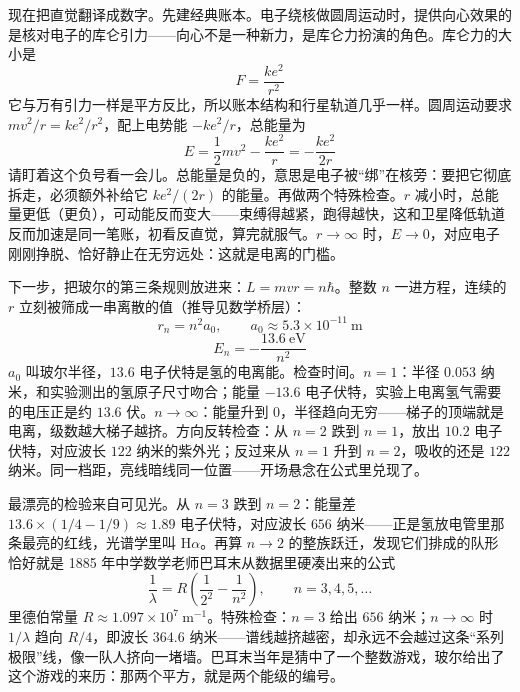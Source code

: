 
\begin{mainline}
现在把直觉翻译成数字。先建经典账本。电子绕核做圆周运动时，提供向心效果的是核对电子的库仑引力——向心不是一种新力，是库仑力扮演的角色。库仑力的大小是
\[
F=\frac{ke^{2}}{r^{2}}
\]
它与万有引力一样是平方反比，所以账本结构和行星轨道几乎一样。圆周运动要求 \(mv^{2}/r=ke^{2}/r^{2}\)，配上电势能 \(-ke^{2}/r\)，总能量为
\[
E=\frac{1}{2}mv^{2}-\frac{ke^{2}}{r}=-\frac{ke^{2}}{2r}
\]
请盯着这个负号看一会儿。总能量是负的，意思是电子被“绑”在核旁：要把它彻底拆走，必须额外补给它 \(ke^{2}/(2r)\) 的能量。再做两个特殊检查。\(r\) 减小时，总能量更低（更负），可动能反而变大——束缚得越紧，跑得越快，这和卫星降低轨道反而加速是同一笔账，初看反直觉，算完就服气。\(r\to\infty\) 时，\(E\to 0\)，对应电子刚刚挣脱、恰好静止在无穷远处：这就是电离的门槛。

下一步，把玻尔的第三条规则放进来：\(L=mvr=n\hbar\)。整数 \(n\) 一进方程，连续的 \(r\) 立刻被筛成一串离散的值（推导见数学桥层）：
\[
r_{n}=n^{2}a_{0},\qquad a_{0}\approx 5.3\times10^{-11}\ \mathrm{m}
\]
\[
E_{n}=-\frac{13.6\ \mathrm{eV}}{n^{2}}
\]
\(a_{0}\) 叫玻尔半径，\(13.6\) 电子伏特是氢的电离能。检查时间。\(n=1\)：半径 \(0.053\) 纳米，和实验测出的氢原子尺寸吻合；能量 \(-13.6\) 电子伏特，实验上电离氢气需要的电压正是约 \(13.6\) 伏。\(n\to\infty\)：能量升到 \(0\)，半径趋向无穷——梯子的顶端就是电离，级数越大梯子越挤。方向反转检查：从 \(n=2\) 跌到 \(n=1\)，放出 \(10.2\) 电子伏特，对应波长 \(122\) 纳米的紫外光；反过来从 \(n=1\) 升到 \(n=2\)，吸收的还是 \(122\) 纳米。同一档距，亮线暗线同一位置——开场悬念在公式里兑现了。

最漂亮的检验来自可见光。从 \(n=3\) 跌到 \(n=2\)：能量差 \(13.6\times(1/4-1/9)\approx1.89\) 电子伏特，对应波长 \(656\) 纳米——正是氢放电管里那条最亮的红线，光谱学里叫 H\(\alpha\)。再算 \(n\to 2\) 的整族跃迁，发现它们排成的队形恰好就是 1885 年中学数学老师巴耳末从数据里硬凑出来的公式
\[
\frac{1}{\lambda}=R\left(\frac{1}{2^{2}}-\frac{1}{n^{2}}\right),\qquad n=3,4,5,\dots
\]
里德伯常量 \(R\approx1.097\times10^{7}\ \mathrm{m^{-1}}\)。特殊检查：\(n=3\) 给出 \(656\) 纳米；\(n\to\infty\) 时 \(1/\lambda\) 趋向 \(R/4\)，即波长 \(364.6\) 纳米——谱线越挤越密，却永远不会越过这条“系列极限”线，像一队人挤向一堵墙。巴耳末当年是猜中了一个整数游戏，玻尔给出了这个游戏的来历：那两个平方，就是两个能级的编号。
\end{mainline}

